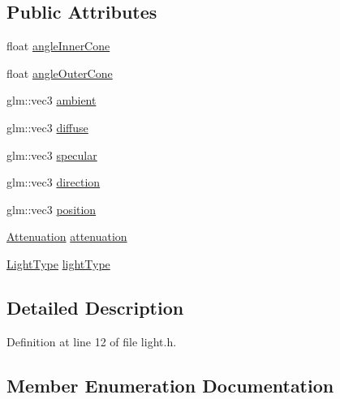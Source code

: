 \subsection*{Public Attributes}
\begin{DoxyCompactItemize}
\item 
float \hyperlink{class_light_aaa42e1c80406d2703241bdda88819c7c}{angle\+Inner\+Cone}
\item 
float \hyperlink{class_light_a5bdec5d32c256ded1b7977b48c351ff3}{angle\+Outer\+Cone}
\item 
glm\+::vec3 \hyperlink{class_light_afaa34bb2efc167adcb2055359fd08a49}{ambient}
\item 
glm\+::vec3 \hyperlink{class_light_ad47b5347556fd8cd9ebdc60fdfed196b}{diffuse}
\item 
glm\+::vec3 \hyperlink{class_light_aefcfb83a0540ddb885c2622061b28d7e}{specular}
\item 
glm\+::vec3 \hyperlink{class_light_a494230a45b5cfa2f9fb54dbd4de3812b}{direction}
\item 
glm\+::vec3 \hyperlink{class_light_a89bffe071ec6431a21c5b54021fe08d6}{position}
\item 
\hyperlink{struct_attenuation}{Attenuation} \hyperlink{class_light_a6684545092d9a9b80422a6612e5cac26}{attenuation}
\item 
\hyperlink{class_light_a661d9480e01af8b1612860b9630ef5f8}{Light\+Type} \hyperlink{class_light_ab0c279c927973443f7b52fc924b489aa}{light\+Type}
\end{DoxyCompactItemize}


\subsection{Detailed Description}


Definition at line 12 of file light.\+h.



\subsection{Member Enumeration Documentation}
\hypertarget{class_light_a661d9480e01af8b1612860b9630ef5f8}{}
